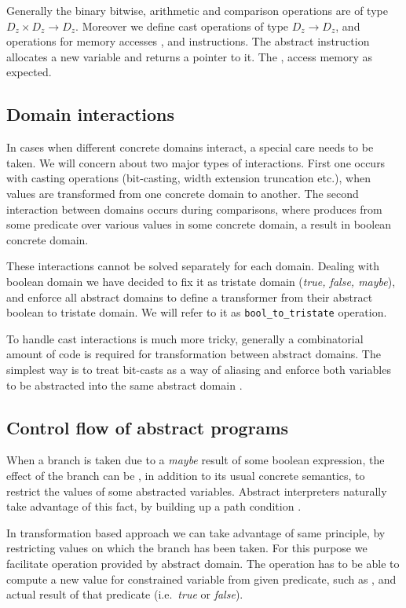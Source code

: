 Generally the binary bitwise, arithmetic and comparison operations are of
type $D_z \times D_z \to D_z$. Moreover we define cast operations of type $D_z \to D_z$,
and operations for memory accesses ,  and  \LLVM
instructions. The abstract  instruction allocates a new 
variable and returns a pointer to it. The ,  access memory as expected.

\subsection{Domain interactions} \label{sec:interactions}
In cases when different concrete domains interact, a special care needs to be
taken. We will concern about two major types of interactions. First one occurs
with casting operations (bit-casting, width extension truncation etc.), when
values are transformed from one concrete domain to another. The second
interaction between domains occurs during comparisons, where \LLVM produces from
some predicate over various values in some concrete domain, a result in boolean
concrete domain.

These interactions cannot be solved separately for each domain. Dealing with
boolean domain we have decided to fix it as tristate domain (\emph{true, false, maybe}),
and enforce all abstract domains to define a transformer from their abstract
boolean to tristate domain. We will refer to it as \texttt{bool\_to\_tristate}
operation.

To handle cast interactions is much more tricky, generally a combinatorial
amount of code is required for transformation between abstract domains. The
simplest way is to treat bit-casts as a way of aliasing and enforce both
variables to be abstracted into the same abstract domain \cite{Rockai15}.


\subsection{Control flow of abstract programs}
When a branch is taken due to a \emph{maybe} result of some boolean expression,
the effect of the branch can be , in addition to its usual concrete semantics,
to restrict the values of some abstracted variables. Abstract interpreters
naturally take advantage of this fact, by building up a path condition
\cite{Rockai15}.

In transformation based approach we can take advantage of same principle, by
restricting values on which the branch has been taken. For this purpose we
facilitate  operation provided by abstract domain. The
 operation has to be able to compute a new value for constrained
variable from given \LLVM predicate, such as , and actual result of
that predicate (i.e.~\emph{true} or \emph{false}).

